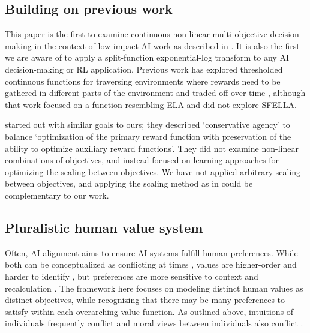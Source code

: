


\subsection{Building on previous work}

This paper is the first to examine continuous non-linear multi-objective decision-making in the context of low-impact AI work as described in \cite{vamplew_potential-based_2021}. It is also the first we are aware of to apply a split-function exponential-log transform to any AI decision-making or RL application.  Previous work has explored thresholded continuous functions for traversing environments where rewards need to be gathered in different parts of the environment and traded off over time \cite{rolf_need_2020}, although that work focused on a function resembling ELA and did not explore SFELLA. 

\cite{turner_conservative_2020} started out with similar goals to ours; they described `conservative agency' to balance `optimization of the primary reward function with preservation of the ability to optimize auxiliary reward functions'. They did not examine non-linear combinations of objectives, and instead focused on learning approaches for optimizing the scaling between objectives. We have not applied arbitrary scaling between objectives, and applying the scaling method as in \cite{turner_conservative_2020} could be complementary to our work.

\subsection{Pluralistic human value system}

Often, AI alignment aims to ensure AI systems fulfill human preferences. While both can be conceptualized as conflicting at times \cite{sotala2016defining}, values are higher-order and harder to identify \cite{barrett2008learning}, but preferences are more sensitive to context and recalculation \cite{warren2011values}. The framework here focuses on modeling distinct human values as distinct objectives, while recognizing that there may be many preferences to satisfy within each overarching value function. As outlined above, intuitions of individuals frequently conflict \cite{haidt2001emotional} and moral views between individuals also conflict \cite{bogosian_implementation_2017}.

